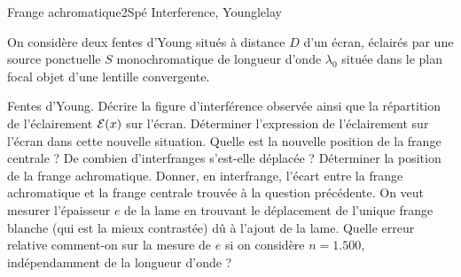 \begin{exercise}{Frange achromatique}{2}{Spé}
{Interference, Young}{lelay}

On considère deux fentes d'Young situés à distance $D$ d'un écran, éclairés par une source ponctuelle $S$ monochromatique de longueur d'onde $\lambda_0$ située dans le plan focal objet d'une lentille convergente.

\begin{questions}
    \questioncours Fentes d'Young. Décrire la figure d'interférence observée ainsi que la répartition de l'éclairement $\cal{E}(x)$ sur l'écran.
    \question Déterminer l'expression de l'éclairement sur l'écran dans cette nouvelle situation. Quelle est la nouvelle position de la frange centrale ? De combien d'interfranges s'est-elle déplacée ?
    \question Déterminer la position de la frange achromatique. Donner, en interfrange, l'écart entre la frange achromatique et la frange centrale trouvée à la question précédente.
    \question On veut mesurer l'épaisseur $e$ de la lame en trouvant le déplacement de l'unique frange blanche (qui est la mieux contrastée) dû à l'ajout de la lame. Quelle erreur relative comment-on sur la mesure de $e$ si on considère $n = 1.500$, indépendamment de la longueur d'onde ?
\end{questions}

\end{exercise}